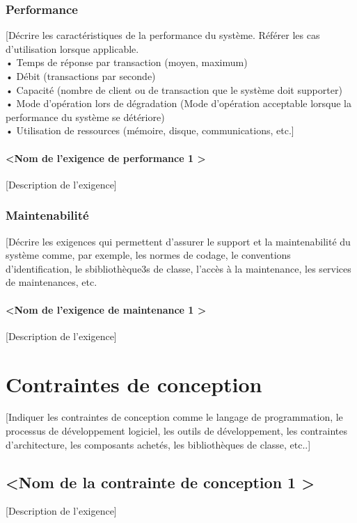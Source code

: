 \documentclass[10pt,a4paper]{report}
\begin{document}
\subsubsection{Performance}
[Décrire les caractéristiques de la performance du système. Référer les cas d’utilisation lorsque applicable.\\
•	Temps de réponse par transaction (moyen, maximum)\\
•	Débit (transactions par seconde)\\
•	Capacité (nombre de client ou de transaction que le système doit supporter)\\
•	Mode d’opération lors de dégradation (Mode d’opération acceptable lorsque la performance du système se détériore)\\
•	Utilisation de ressources (mémoire, disque, communications, etc.]
\paragraph{\textless Nom de l’exigence de performance 1 \textgreater}
[Description de l’exigence]

\subsubsection{Maintenabilité}
[Décrire les exigences qui permettent d’assurer le support et la maintenabilité du système comme, par exemple, les normes de codage, le conventions d’identification, le sbibliothèque3s de classe, l’accès à la maintenance, les services de maintenances, etc. 
\paragraph{\textless Nom de l’exigence de maintenance 1 \textgreater}
[Description de l’exigence]


\section{Contraintes de conception}
[Indiquer les contraintes de conception comme le langage de programmation, le processus de développement logiciel, les outils de développement, les contraintes d’architecture, les composants achetés, les bibliothèques de classe, etc..]

\subsection{\textless Nom de la contrainte de conception 1 \textgreater}
[Description de l’exigence]
\end{document}
